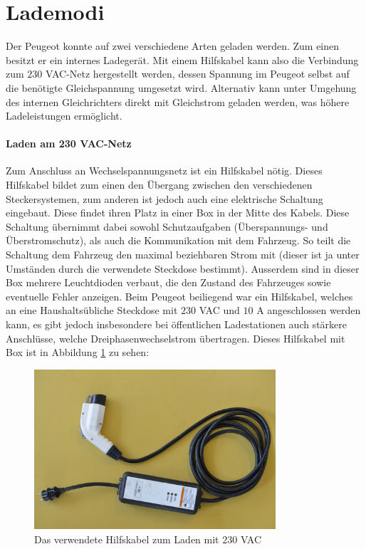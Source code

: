 \section{Lademodi}
Der Peugeot konnte auf zwei verschiedene Arten geladen werden. Zum einen besitzt er ein internes Ladegerät. Mit einem Hilfskabel kann also die Verbindung zum $230$ VAC-Netz hergestellt werden, dessen Spannung im Peugeot selbst auf die benötigte Gleichspannung umgesetzt wird. Alternativ kann unter Umgehung des internen Gleichrichters direkt mit Gleichstrom geladen werden, was höhere Ladeleistungen ermöglicht.

\paragraph{Laden am 230 VAC-Netz}
Zum Anschluss an Wechselspannungsnetz ist ein Hilfskabel nötig. Dieses Hilfskabel bildet zum einen den Übergang zwischen den verschiedenen Steckersystemen, zum anderen ist jedoch auch eine elektrische Schaltung eingebaut. Diese findet ihren Platz in einer Box in der Mitte des Kabels. Diese Schaltung übernimmt dabei sowohl Schutzaufgaben (Überspannungs- und Überstromschutz), als auch die Kommunikation mit dem Fahrzeug. So teilt die Schaltung dem Fahrzeug den maximal beziehbaren Strom mit (dieser ist ja unter Umständen durch die verwendete Steckdose bestimmt). Ausserdem sind in dieser Box mehrere Leuchtdioden verbaut, die den Zustand des Fahrzeuges sowie eventuelle Fehler anzeigen. Beim Peugeot beiliegend war ein Hilfskabel, welches an eine Haushaltsübliche Steckdose mit $230$ VAC und $10$ A angeschlossen werden kann, es gibt jedoch insbesondere bei öffentlichen Ladestationen auch stärkere Anschlüsse, welche Dreiphasenwechselstrom übertragen. Dieses Hilfskabel mit Box ist in Abbildung \ref{fig:Hilfskabel} zu sehen:

\begin{figure}[h]
	\centering
		\includegraphics[width=0.80\textwidth]{images/Hilfskabel.JPG}
	\caption{Das verwendete Hilfskabel zum Laden mit $230$ VAC}
	\label{fig:Hilfskabel}
\end{figure}

